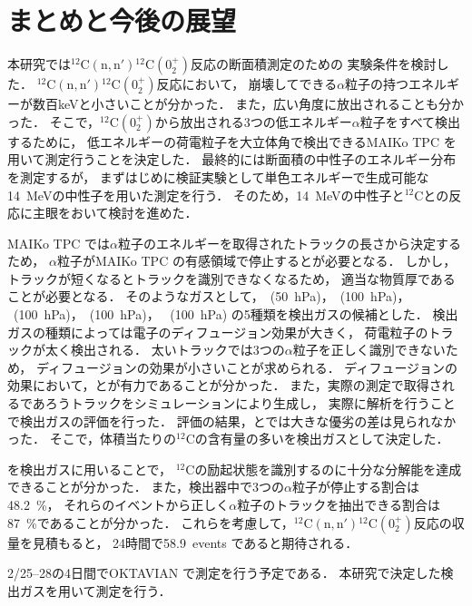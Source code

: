 \documentclass[../master]{subfiles}
\begin{document}
\chapter{まとめと今後の展望}
本研究では${}^{12}\mathrm{C}(\mathrm{n}, \mathrm{n}'){}^{12}\mathrm{C} (0_2^+)$反応の断面積測定のための
実験条件を検討した．
${}^{12}\mathrm{C}(\mathrm{n}, \mathrm{n}'){}^{12}\mathrm{C} (0_2^+)$反応において，
崩壊してできる$\alpha$粒子の持つエネルギーが数百\si{\kilo\electronvolt}と小さいことが分かった．
また，広い角度に放出されることも分かった．
そこで，${}^{12}\mathrm{C} (0_2^+)$から放出される3つの低エネルギー$\alpha$粒子をすべて検出するために，
低エネルギーの荷電粒子を大立体角で検出できるMAIKo TPC を用いて測定行うことを決定した．
最終的には断面積の中性子のエネルギー分布を測定するが，
まずはじめに検証実験として単色エネルギーで生成可能な\SI{14}{\mega\electronvolt}の中性子を用いた測定を行う．
そのため，\SI{14}{\mega\electronvolt}の中性子と${}^{12}\mathrm{C}$との反応に主眼をおいて検討を進めた．

MAIKo TPC では$\alpha$粒子のエネルギーを取得されたトラックの長さから決定するため，
$\alpha$粒子がMAIKo TPC の有感領域で停止するとが必要となる．
しかし，トラックが短くなるとトラックを識別できなくなるため，
適当な物質厚であることが必要となる．
そのようなガスとして，\Methane~(\SI{50}{\hecto\pascal})，\MethaneHydro~(\SI{100}{\hecto\pascal})，
\MethaneHerium~(\SI{100}{\hecto\pascal})，\isoButaneHydro~(\SI{100}{\hecto\pascal})，
\isoButaneHerium~(\SI{100}{\hecto\pascal}) の5種類を検出ガスの候補とした．
検出ガスの種類によっては電子のディフュージョン効果が大きく，
荷電粒子のトラックが太く検出される．
太いトラックでは3つの$\alpha$粒子を正しく識別できないため，
ディフュージョンの効果が小さいことが求められる．
ディフュージョンの効果において，\MethaneHydro と\isoButaneHydro が有力であることが分かった．
また，実際の測定で取得されるであろうトラックをシミュレーションにより生成し，
実際に解析を行うことで検出ガスの評価を行った．
評価の結果，\MethaneHydro と\isoButaneHydro では大きな優劣の差は見られなかった．
そこで，体積当たりの${}^{12}\mathrm{C}$の含有量の多い\isoButaneHydro を検出ガスとして決定した．

\isoButaneHydro を検出ガスに用いることで，
${}^{12}\mathrm{C}$の励起状態を識別するのに十分な分解能を達成できることが分かった．
また，検出器中で3つの$\alpha$粒子が停止する割合は\SI{48.2}{\percent}，
それらのイベントから正しく$\alpha$粒子のトラックを抽出できる割合は\SI{87}{\percent}であることが分かった．
これらを考慮して，${}^{12}\mathrm{C}(\mathrm{n}, \mathrm{n}'){}^{12}\mathrm{C} (0_2^+)$反応の収量を見積もると，
24時間で58.9~events であると期待される．

2/25--28の4日間でOKTAVIAN で測定を行う予定である．
本研究で決定した検出ガスを用いて測定を行う．
\end{document}
